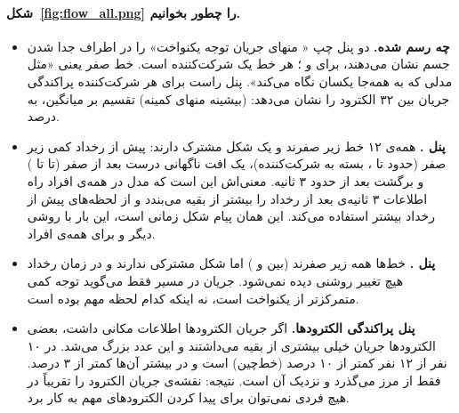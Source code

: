 \paragraph{شکل~\ref{fig:flow_all.png} را چطور بخوانیم.}
\begin{itemize}
\item \textbf{چه رسم شده.} دو پنل چپ « منهای جریان توجه یکنواخت» را در اطراف جدا شدن جسم نشان می‌دهند، برای  و ؛ هر خط یک شرکت‌کننده است. خط صفر یعنی «مثل مدلی که به همه‌جا یکسان نگاه می‌کند». پنل راست برای هر شرکت‌کننده پراکندگی جریان بین ۳۲ الکترود را نشان می‌دهد: (بیشینه منهای کمینه) تقسیم بر میانگین، به درصد.
\item \textbf{پنل .} همه‌ی ۱۲ خط زیر صفرند و یک شکل مشترک دارند: پیش از رخداد کمی زیر صفر (حدود  تا ، بسته به شرکت‌کننده)، یک افت ناگهانی درست بعد از صفر (تا  تا ) و برگشت بعد از حدود ۳ ثانیه. معنی‌اش این است که مدل  در همه‌ی افراد راه اطلاعات ۳ ثانیه‌ی بعد از رخداد را بیشتر از بقیه می‌بندد و از لحظه‌های پیش از رخداد بیشتر استفاده می‌کند. این همان پیام شکل زمانی  است، این بار با روشی دیگر و برای همه‌ی افراد.
\item \textbf{پنل .} خط‌ها همه زیر صفرند (بین  و ) اما شکل مشترکی ندارند و در زمان رخداد هیچ تغییر روشنی دیده نمی‌شود. جریان در مسیر  فقط می‌گوید توجه کمی متمرکزتر از یکنواخت است، نه اینکه کدام لحظه مهم بوده است.
\item \textbf{پنل پراکندگی الکترودها.} اگر جریان الکترودها اطلاعات مکانی داشت، بعضی الکترودها جریان خیلی بیشتری از بقیه می‌داشتند و این عدد بزرگ می‌شد. در ۱۰ نفر از ۱۲ نفر کمتر از ۱۰ درصد (خط‌چین) است و در بیشتر آن‌ها کمتر از ۳ درصد. فقط  از مرز می‌گذرد و  نزدیک آن است. نتیجه: نقشه‌ی جریان الکترود را تقریباً در هیچ فردی نمی‌توان برای پیدا کردن الکترودهای مهم به کار برد.
\end{itemize}


